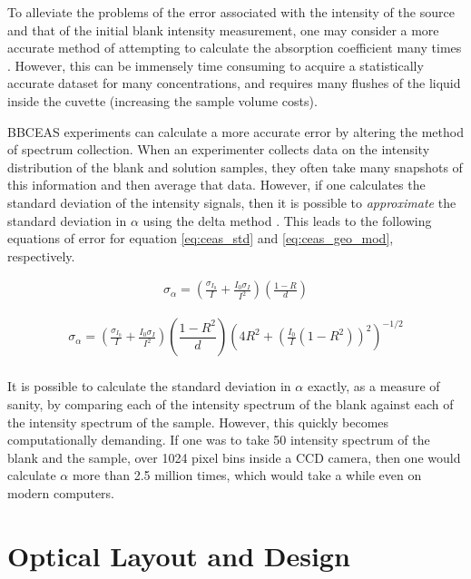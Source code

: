 To alleviate the problems of the error associated with the intensity of the
source and that of the initial blank intensity measurement, one may consider a
more accurate method of attempting to calculate the absorption coefficient many
times \cite{Islam:2007ea}. However, this can be immensely time consuming to
acquire a statistically accurate dataset for many concentrations, and requires
many flushes of the liquid inside the cuvette (increasing the sample volume
costs).

\ac{BBCEAS} experiments can calculate a more accurate error by altering the
method of spectrum collection. When an experimenter collects data on the
intensity distribution of the blank and solution samples, they often take many
snapshots of this information and then average that data. However, if one
calculates the standard deviation of the intensity signals, then it is possible
to \emph{approximate} the standard deviation in $\alpha$ using the delta method
\cite{Casella:2002tp}. This leads to the following equations of error for
equation \eqref{eq:ceas_std} and \eqref{eq:ceas_geo_mod}, respectively.

    \begin{align}
      \sigma_\alpha = \left(\frac{\sigma_{I_0}}{I} +
             \frac{I_0\sigma_I}{I^2}\right)
            \left(\frac{1-R}{d}\right)\label{eq:ceas_err_std}
    \end{align}


    \begin{align}
      \sigma_\alpha = \left(\frac{\sigma_{I_0}}{I} +
             \frac{I_0\sigma_I}{I^2}\right)
            \left(\dfrac{1-R^2}{d}\right)\left(4R^2+\left(
                                     \frac{I_0}{I}(1-R^2)\right)^2
                                     \right)^{-1/2}\label{eq:ceas_err_geo}\\
    \end{align}

It is possible to calculate the standard deviation in $\alpha$ exactly, as a
measure of sanity, by comparing each of the intensity spectrum of the
blank against each of the intensity spectrum of the sample. However, this
quickly becomes computationally demanding. If one was to take 50
intensity spectrum of the blank and the sample, over 1024 pixel bins inside a
CCD camera, then one would calculate $\alpha$ more than 2.5 million times,
which would take a while even on modern computers.



\section{Optical Layout and Design}\label{sec:optical_layout}

